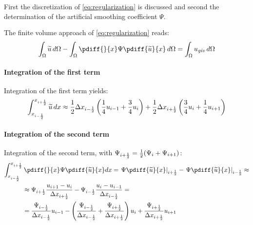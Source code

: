 First the discretization of \autoref{eq:regularization} is discussed and second the determination of the artificial smoothing coefficient $\Psi$.

The finite volume approach of \autoref{eq:regularization} reads:
\begin{align}
\int_\Omega \widetilde u\, d\Omega  - \int_\Omega \pdiff{}{x}  \Psi \pdiff{\widetilde u}{x}\, d\Omega  = \int_\Omega  u_{\it{giv}}\, d\Omega \label{eq:1d_regularization}
\end{align}
\paragraph*{Integration of the first term}
Integration of the first term yields: %
\begin{align}
\int_{x_{i-\frac{1}{2}}}^{x_{i+\frac{1}{2}}} \widetilde u\, dx \approx
\frac{1}{2} \Delta x_{i-\frac{1}{2}} \left( \frac{1}{4} u_{i-1} + \frac{3}{4} u_{i} \right)  +
\frac{1}{2} \Delta x_{i+\frac{1}{2}} \left( \frac{3}{4} u_{i} + \frac{1}{4} u_{i+1} \right)
\end{align}
\paragraph*{Integration of the second term}
Integration of the second term, with $\Psi_{i+\frac{1}{2}} = \frac{1}{2}(\Psi_{i} + \Psi_{i+1})$:
\begin{align}
\int_{x_{i-\half}}^{x_{i+\half}} &\, \pdiff{}{x} \Psi \pdiff{\widetilde u}{x} dx  =
\left. \Psi \pdiff{\widetilde u}{x} \right|_{i+\half} -  \left. \Psi \pdiff{\widetilde u}{x} \right|_{i-\half} \approx \\
& \approx \Psi_{i+\half} \frac{ u_{i+1} -  u_{i}}{\Dx_{i+\half}} - \Psi_{i-\half} \frac{ u_{i} -  u_{i-1}}{\Dx_{i-\half}} = \\
&=  \frac{\Psi_{i-\half}}{\Dx_{i-\half}}   u_{i-1}
-  \left( \frac{\Psi_{i-\half}}{{\Dx_{i-\half}}}
+  \frac{\Psi_{i+\half}}{{\Dx_{i+\half}}} \right)  u_{i}
+ \frac{\Psi_{i+\half}}{{\Dx_{i+\half}}}   u_{i+1}
\end{align}
